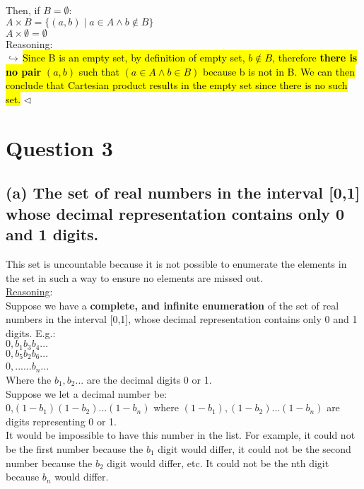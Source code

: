 \documentclass[a4paper, 12pt]{article}
\begin{document}
Then, if $B = \emptyset$:\\
$A \times B = \{(a,b) \;| \; a \in A \land b \notin B\}$\\
$A \times \emptyset = \emptyset$\\

Reasoning:\\
$\hookrightarrow\,$\hl{Since B is an empty set, by definition of empty set, $b\notin B$, therefore \textbf{there is no pair} $(a, b)$ such that $(a \in A \land b \in B)$ because b is not in B. We can then conclude that Cartesian product results in the empty set since there is no such set.} $\lhd$




\section*{Question 3}

\subsection*{(a) The set of real numbers in the interval [0,1] whose decimal representation contains only 0 and 1 digits.} 

This set is uncountable because it is not possible to enumerate the elements in the set in such a way to ensure no elements are missed out.\\

\underline{Reasoning}:\\

Suppose we have a \textbf{complete, and infinite enumeration} of the set of real numbers in the interval [0,1], whose decimal representation contains only 0 and 1 digits. E.g.:\\

$0,b_{1} b_{3} b_{4}...$\\
$0,b_{5} b_{2} b_{6}...$\\
$0,......b_{n}$...\\

Where the $b_{1}, b_{2}$... are the decimal digits 0 or 1.\\

Suppose we let a decimal number be:\\
0,$(1-b_{1})(1-b_{2})...(1-b_{n})$ where $(1-b_{1}), (1-b_{2})... (1-b_{n})$ are digits representing 0 or 1.\\

It would be impossible to have this number in the list. For example, it could not be the first number because the $b_{1}$ digit would differ, it could not be the second number because the $b_{2}$ digit would differ, etc. It could not be the nth digit because $b_{n}$ would differ.\\
\end{document}
